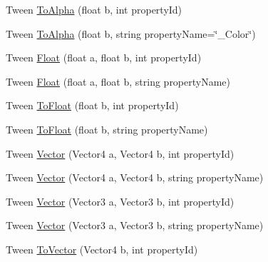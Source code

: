 \begin{DoxyCompactItemize}
\item 
Tween \mbox{\hyperlink{struct_leap_1_1_unity_1_1_leap_1_1_unity_1_1_animation_1_1_internal_1_1_material_selector_a7194c15fb21d203c9fe3b1e2d7287e1e}{To\+Alpha}} (float b, int property\+Id)
\item 
Tween \mbox{\hyperlink{struct_leap_1_1_unity_1_1_leap_1_1_unity_1_1_animation_1_1_internal_1_1_material_selector_acab80d7f8a9a00c7123438b30bf34ee1}{To\+Alpha}} (float b, string property\+Name=\char`\"{}\+\_\+\+Color\char`\"{})
\item 
Tween \mbox{\hyperlink{struct_leap_1_1_unity_1_1_leap_1_1_unity_1_1_animation_1_1_internal_1_1_material_selector_a9f46fbdd7db362595941227d98251899}{Float}} (float a, float b, int property\+Id)
\item 
Tween \mbox{\hyperlink{struct_leap_1_1_unity_1_1_leap_1_1_unity_1_1_animation_1_1_internal_1_1_material_selector_a9a3c7a12dc2d4bab2d7a99207585ac25}{Float}} (float a, float b, string property\+Name)
\item 
Tween \mbox{\hyperlink{struct_leap_1_1_unity_1_1_leap_1_1_unity_1_1_animation_1_1_internal_1_1_material_selector_a6340cd18d0ba3436df058905afc4e4fc}{To\+Float}} (float b, int property\+Id)
\item 
Tween \mbox{\hyperlink{struct_leap_1_1_unity_1_1_leap_1_1_unity_1_1_animation_1_1_internal_1_1_material_selector_a077c969a61fb53be093f09c7a3d2328c}{To\+Float}} (float b, string property\+Name)
\item 
Tween \mbox{\hyperlink{struct_leap_1_1_unity_1_1_leap_1_1_unity_1_1_animation_1_1_internal_1_1_material_selector_a3137527ffefd37a729733b57c92a491f}{Vector}} (Vector4 a, Vector4 b, int property\+Id)
\item 
Tween \mbox{\hyperlink{struct_leap_1_1_unity_1_1_leap_1_1_unity_1_1_animation_1_1_internal_1_1_material_selector_a8d28037d076844bbc13e5fb6cc6cb7fd}{Vector}} (Vector4 a, Vector4 b, string property\+Name)
\item 
Tween \mbox{\hyperlink{struct_leap_1_1_unity_1_1_leap_1_1_unity_1_1_animation_1_1_internal_1_1_material_selector_af38136955e5979399caae649abbf929c}{Vector}} (Vector3 a, Vector3 b, int property\+Id)
\item 
Tween \mbox{\hyperlink{struct_leap_1_1_unity_1_1_leap_1_1_unity_1_1_animation_1_1_internal_1_1_material_selector_a4e7cfa5a35ec519fa675ea1e302fa0cd}{Vector}} (Vector3 a, Vector3 b, string property\+Name)
\item 
Tween \mbox{\hyperlink{struct_leap_1_1_unity_1_1_leap_1_1_unity_1_1_animation_1_1_internal_1_1_material_selector_a26e932c74758c0692bcf6a556c520fb7}{To\+Vector}} (Vector4 b, int property\+Id)

\end{DoxyCompactItemize}
